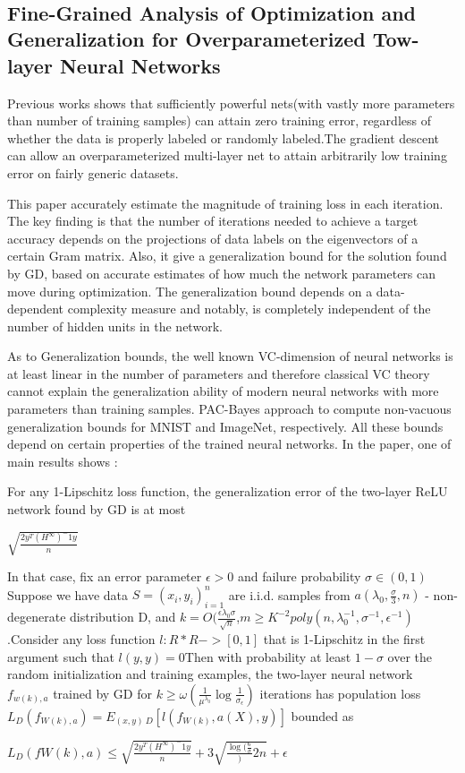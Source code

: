 \documentclass{article}
\begin{document}
\\
\subsection{Fine-Grained Analysis of Optimization and Generalization for Overparameterized Tow-layer Neural Networks}
Previous works shows that sufficiently powerful nets(with vastly more parameters than number of training samples) can attain zero training error, regardless of whether the data is properly labeled or randomly labeled.The gradient descent can allow an overparameterized multi-layer net to attain arbitrarily low training error on fairly generic datasets.

This paper accurately estimate the magnitude of training loss in each iteration. The key finding is that the number of iterations needed to achieve a target accuracy depends on the projections of data labels on the eigenvectors of a certain Gram matrix. Also, it give a generalization bound for the solution found by GD, based on accurate estimates of how much the network parameters can move during optimization. The generalization bound depends on a data-dependent complexity measure and notably, is completely independent of the number of hidden units in the network.

As to Generalization bounds, the well known VC-dimension of neural networks is at least linear in the number of parameters and therefore classical VC theory cannot explain the generalization ability of modern neural networks with more parameters than training samples. PAC-Bayes approach to compute non-vacuous generalization bounds for MNIST and ImageNet, respectively. All these bounds depend on certain properties of the trained neural networks. In the paper, one of main results shows :

For any 1-Lipschitz loss function, the generalization error of the two-layer ReLU network found by GD is at most 
\begin{center}
  $\sqrt{\frac{2y^T(H^\infty)^-1y}{n}}$
\end{center}
In that case, fix an error parameter $\epsilon > 0$ and failure probability $\sigma \in (0,1)$ Suppose we have data $S={(x_i,y_i)}_{i=1}^n$ are i.i.d. samples from $a (\lambda_0,\frac{\sigma}{3},n)$ - non-degenerate distribution D, and $k = O(\frac{\epsilon\lambda_0\sigma}{\sqrt{n}}$,$m \geq K^{-2}poly(n,\lambda_0^{-1},\sigma^{-1},\epsilon^{-1})$.Consider any loss function $l:R*R ->[0,1]$ that is 1-Lipschitz in the first argument such that $l(y,y)=0 $Then with probability at least $1-\sigma$ over the random initialization and training examples, the two-layer neural network $f_{w(k),a}$ trained by GD for $k\geq\omega(\frac{1}{\mu^{\lambda_0}}\log{\frac{1}{\sigma_\epsilon}})$ iterations has population loss $L_D(f_{W(k),a})= E_{(x,y)~D}[l(f_{W(k)},a(X),y)]$ bounded as
\begin{center}
    $L_D(f{W(k),a})\leq \sqrt{\frac{2y^T(H^\infty)^-1y}{n}} +3\sqrt{\frac{\log(\frac{6}{\sigma}}){2n}}+\epsilon$
\end{center}
\end{document}
